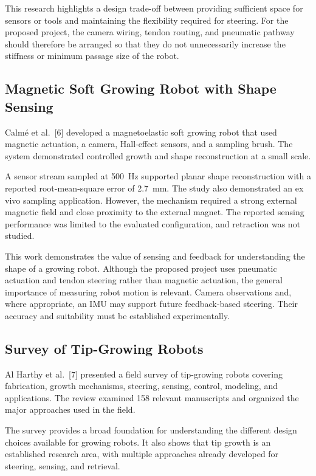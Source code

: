 This research highlights a design trade-off between providing sufficient space for sensors or tools and maintaining the flexibility required for steering. For the proposed project, the camera wiring, tendon routing, and pneumatic pathway should therefore be arranged so that they do not unnecessarily increase the stiffness or minimum passage size of the robot.

\subsection{Magnetic Soft Growing Robot with Shape Sensing}

Calm\'e et al.~[6] developed a magnetoelastic soft growing robot that used magnetic actuation, a camera, Hall-effect sensors, and a sampling brush. The system demonstrated controlled growth and shape reconstruction at a small scale.

A sensor stream sampled at 500~Hz supported planar shape reconstruction with a reported root-mean-square error of 2.7~mm. The study also demonstrated an ex vivo sampling application. However, the mechanism required a strong external magnetic field and close proximity to the external magnet. The reported sensing performance was limited to the evaluated configuration, and retraction was not studied.

This work demonstrates the value of sensing and feedback for understanding the shape of a growing robot. Although the proposed project uses pneumatic actuation and tendon steering rather than magnetic actuation, the general importance of measuring robot motion is relevant. Camera observations and, where appropriate, an IMU may support future feedback-based steering. Their accuracy and suitability must be established experimentally.

\subsection{Survey of Tip-Growing Robots}

Al Harthy et al.~[7] presented a field survey of tip-growing robots covering fabrication, growth mechanisms, steering, sensing, control, modeling, and applications. The review examined 158 relevant manuscripts and organized the major approaches used in the field.

The survey provides a broad foundation for understanding the different design choices available for growing robots. It also shows that tip growth is an established research area, with multiple approaches already developed for steering, sensing, and retrieval.

